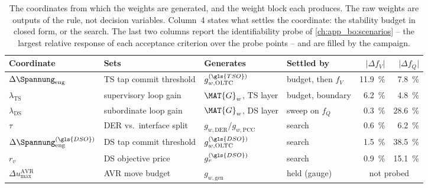 \begin{table}[htbp]
	\centering
	\caption[The coordinates from which the weights are generated.]%
	{The coordinates from which the weights are generated, and the weight block each produces.
		The raw weights are outputs of the rule, not decision variables.
		Column~4 states what settles the coordinate: the stability budget in closed form, or the search.
		The last two columns report the identifiability probe of \cref{ch:app_bo:scenarios} -- the largest relative response of each acceptance criterion over the probe points -- and are filled by the campaign.}
	\label{tab:param:weights:coords}
	\label{tab:app_bo:space}%
	\label{tab:bo_decision_space}%
	\label{tab:app_wsel:coords}%
	\small
	\begin{tabular}{l l l l r r}
		\toprule
		Coordinate & Sets & Generates & Settled by & $\lvert\Delta f_{V}\rvert$ & $\lvert\Delta f_{Q}\rvert$ \\
		\midrule
		$\Delta\Spannung_{\mathrm{eng}}$                          & \gls{TS} tap commit threshold  & $g_{w,\mathrm{OLTC}}^{(\gls{TSO})}$      & budget, then $f_{V}$ & \qty{11.9}{\percent} & \qty{7.8}{\percent} \\
		$\lambda_{\mathrm{TS}}$          & supervisory loop gain          & $\MAT{G}_{w}$, \gls{TS} layer            & budget, boundary   & \qty{6.2}{\percent} & \qty{4.8}{\percent} \\
		$\lambda_{\mathrm{DS}}$          & subordinate loop gain          & $\MAT{G}_{w}$, \gls{DS} layer            & sweep on $f_{Q}$     & \qty{0.3}{\percent} & \qty{28.6}{\percent} \\
		$\tau$                           & \gls{DER} vs.\ interface split & $g_{w,\mathrm{DER}}/g_{w,\mathrm{PCC}}$  & search             & \qty{0.6}{\percent} & \qty{6.2}{\percent} \\
		$\Delta\Spannung_{\mathrm{eng}}^{(\gls{DSO})}$            & \gls{DS} tap commit threshold  & $g_{w,\mathrm{OLTC}}^{(\gls{DSO})}$      & search             & \qty{1.5}{\percent} & \qty{38.5}{\percent} \\
		$r_{v}$                          & \gls{DS} objective price       & $g_{v}^{(\gls{DSO})}$                    & search             & \qty{0.9}{\percent} & \qty{15.1}{\percent} \\
		\midrule
		$\Delta u_{\max}^{\mathrm{AVR}}$ & \gls{AVR} move budget          & $g_{w,\mathrm{gen}}$                     & held (gauge)       & \multicolumn{2}{c}{not probed} \\
		\bottomrule
	\end{tabular}
\end{table}

